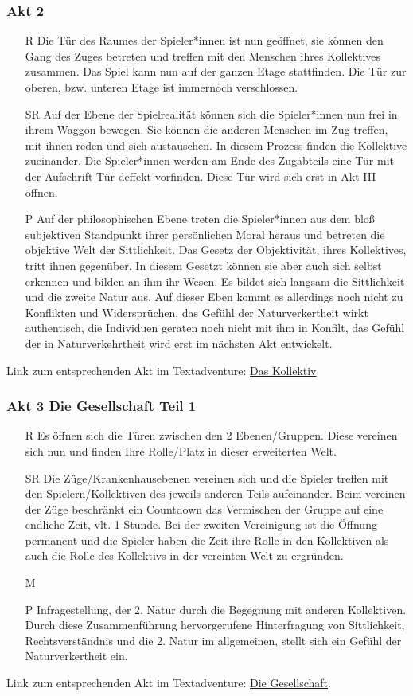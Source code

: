 \documentclass[a4paper, 12pt]{scrartcl}
\begin{document}
    \subsubsection{Akt 2}
    \begin{itemize}
    \item[R] Die Tür des Raumes der Spieler*innen ist nun geöffnet, sie können den Gang des Zuges betreten und treffen mit den Menschen ihres Kollektives zusammen.
    Das Spiel kann nun auf der ganzen Etage stattfinden. 
    Die Tür zur oberen, bzw. unteren Etage ist immernoch verschlossen.
    \item[SR] Auf der Ebene der Spielrealität können sich die Spieler*innen nun frei in ihrem Waggon bewegen. 
    Sie können die anderen Menschen im Zug treffen, mit ihnen reden und sich austauschen. 
    In diesem Prozess finden die Kollektive zueinander.
    Die Spieler*innen werden am Ende des Zugabteils eine Tür mit der Aufschrift \glqq Tür deffekt\grqq{} vorfinden.
    Diese Tür wird sich erst in Akt III öffnen.
    \item[P] Auf der philosophischen Ebene treten die Spieler*innen aus dem bloß subjektiven Standpunkt ihrer persönlichen Moral heraus und betreten die objektive Welt der Sittlichkeit.
    Das Gesetz der Objektivität, ihres Kollektives, tritt ihnen gegenüber.
    In diesem Gesetzt können sie aber auch sich selbst erkennen und bilden an ihm ihr Wesen. 
    Es bildet sich langsam die Sittlichkeit und die zweite Natur aus.
    Auf dieser Eben kommt es allerdings noch nicht zu Konflikten und Widersprüchen, das Gefühl der Naturverkertheit wirkt authentisch, die Individuen geraten noch nicht mit ihm in Konfilt, das Gefühl der in Naturverkehrtheit wird erst im nächsten Akt entwickelt.
    \end{itemize}
    Link zum entsprechenden Akt im Textadventure: \hyperref[das-kollektiv]{Das Kollektiv}.
    \subsubsection{Akt 3 Die Gesellschaft Teil 1}
    \begin{itemize}
	\item[R] Es \"offnen sich die T\"uren zwischen den 2 Ebenen/Gruppen. Diese vereinen sich nun und finden Ihre Rolle/Platz in dieser erweiterten \dq Welt{\dq}.
	\item[SR] Die Z\"uge/Krankenhausebenen vereinen sich und die Spieler treffen mit den Spielern/Kollektiven des jeweils anderen Teils aufeinander. Beim vereinen der Z\"uge beschr\"ankt ein Countdown das Vermischen der Gruppe auf eine endliche Zeit, vlt. 1 Stunde. Bei der zweiten Vereinigung ist die \"Offnung permanent und die Spieler haben die Zeit ihre Rolle in den Kollektiven als auch die Rolle des Kollektivs in der vereinten Welt zu ergr\"unden.
	\item[M]
	\item[P] Infragestellung, der 2. Natur durch die Begegnung mit anderen Kollektiven.
	Durch diese Zusammenf\"uhrung hervorgerufene Hinterfragung von Sittlichkeit, Rechtsverst\"andnis und die 2. Natur im allgemeinen, stellt sich ein Gef\"uhl der Naturverkertheit ein. 
    \end{itemize}
    Link zum entsprechenden Akt im Textadventure: \hyperref[die-gesellschaft]{Die Gesellschaft}.
\end{document}
